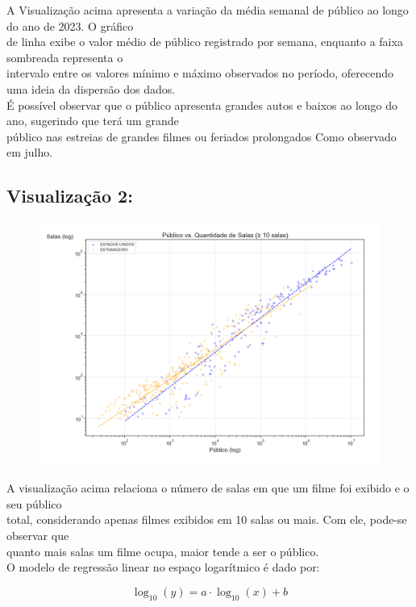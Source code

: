 \documentclass{article}
\begin{document}
A Visualização acima apresenta a variação da média semanal de público ao longo do ano de 2023. O gráfico\\
de linha exibe o valor médio de público registrado por semana, enquanto a faixa sombreada representa o\\
intervalo entre os valores mínimo e máximo observados no período, oferecendo uma ideia da dispersão dos dados.\\
 É possível observar que o público apresenta grandes autos e baixos ao longo do ano, sugerindo que terá um grande\\
público nas estreias de grandes filmes ou feriados prolongados Como observado em julho.
\subsection*{Visualização 2:}
\begin{figure}[H]
    \centerline{\includegraphics[width = \linewidth]{img/Figure_2.png}}
\end{figure}

 A visualização acima relaciona o número de salas em que um filme foi exibido e o seu público\\
total, considerando apenas filmes exibidos em 10 salas ou mais. Com ele, pode-se observar que\\
quanto mais salas um filme ocupa, maior tende a ser o público.\\


O modelo de regressão linear no espaço logarítmico é dado por:

\[
\log_{10}(y) = a \cdot \log_{10}(x) + b
\]
\end{document}

